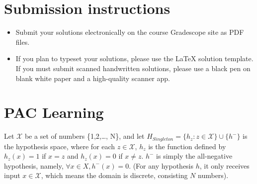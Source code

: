 \documentclass[11pt]{article}
\begin{document}
\author{}
\date{}
\maketitle
\vspace{-0.75in}

\vspace{-11pt}
\ifsoln
\else
\section*{Submission instructions}
\begin{itemize}
\item 
Submit your solutions electronically on the course Gradescope site as PDF files.
\item If you plan to typeset your solutions, please use the LaTeX solution template. If you must submit scanned handwritten solutions, please use a black pen on blank white paper and a high-quality scanner app.

\end{itemize}
\fi

\section{PAC Learning }
Let $\mathcal{X}$ be a set of numbers \{1,2,\ldots, N\}, and let $H_{Singleton} = \{h_z : z \in \mathcal{X}\}\cup\{h^{-}\}$ is the hypothesis space, where for each $z \in \mathcal{X}$, $h_z$ is the function defined by $h_z(x) = 1$ if $x = z$ and $h_z(x) = 0$ if $x \neq z$. $h^{-}$ is simply the all-negative hypothesis, namely, $\forall x \in X, h^{-}(x) = 0$. (For any hypothesis $h$, it only receives input $x \in \mathcal{X}$, which means the domain is discrete, consisting $N$ numbers).
\end{document}
